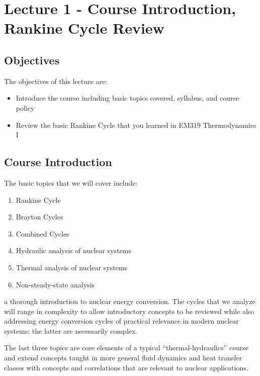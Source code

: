 \documentclass{tufte-book}
\begin{document}
\chapter{Lecture 1 - Course Introduction, Rankine Cycle Review}
\label{ch:lec1}%
\section{Objectives}
The objectives of this lecture are:
\begin{itemize}
\item Introduce the course including basic topics covered, syllabus, and course policy
\item Review the basic Rankine Cycle that you learned in EM319 Thermodynamics I
\end{itemize}

\section{Course Introduction}
The basic topics that we will cover include:
\begin{enumerate}
\item Rankine Cycle 
\item Brayton Cycles
\item Combined Cycles 
\item Hydraulic analysis of nuclear systems
\item Thermal analysis of nuclear systems
\item Non-steady-state analysis 
\end{enumerate}
 a thorough introduction to nuclear energy conversion.  The cycles that we analyze will range in complexity to allow introductory concepts to be reviewed while also addressing energy conversion cycles of practical relevance in modern nuclear systems; the latter are necessarily complex.

The last three topics are core elements of a typical ``thermal-hydraulics'' course and extend concepts taught in more general fluid dynamics and heat transfer classes with concepts and correlations that are relevant to nuclear applications.
\end{document}
